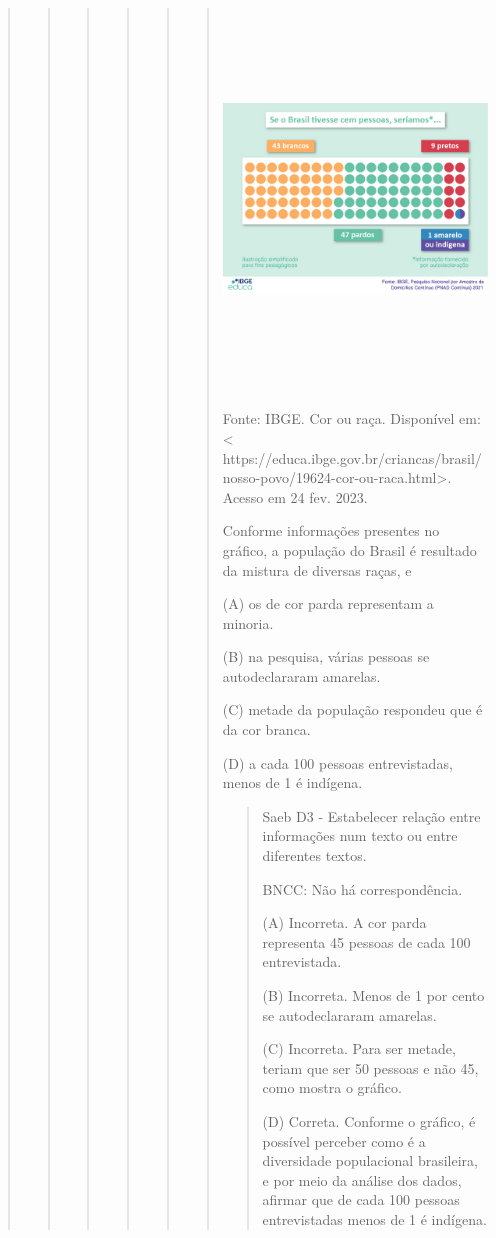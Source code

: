 \begin{quote}
\begin{quote}
\begin{quote}
\begin{quote}
\begin{quote}
\begin{quote}
\includegraphics[width=5.51042in,height=3.98702in]{media/image32.jpeg}

\protect\hypertarget{_Hlk40547643}{}{}

Fonte: IBGE. Cor ou raça. Disponível em: \textless{}
https://educa.ibge.gov.br/criancas/brasil/nosso-povo/19624-cor-ou-raca.html\textgreater{}.
Acesso em 24 fev. 2023.

Conforme informações presentes no gráfico, a população do Brasil é
resultado da mistura de diversas raças, e

(A) os de cor parda representam a minoria.

(B) na pesquisa, várias pessoas se autodeclararam amarelas.

(C) metade da população respondeu que é da cor branca.

(D) a cada 100 pessoas entrevistadas, menos de 1 é indígena.

\begin{quote}
Saeb D3 - Estabelecer relação entre informações num texto ou entre
diferentes textos.

BNCC: Não há correspondência.

(A) Incorreta. A cor parda representa 45 pessoas de cada 100
entrevistada.

(B) Incorreta. Menos de 1 por cento se autodeclararam amarelas.

(C) Incorreta. Para ser metade, teriam que ser 50 pessoas e não 45, como
mostra o gráfico.

(D) Correta. Conforme o gráfico, é possível perceber como é a
diversidade populacional brasileira, e por meio da análise dos dados,
afirmar que de cada 100 pessoas entrevistadas menos de 1 é indígena.
\end{quote}


\end{quote}
\end{quote}
\end{quote}
\end{quote}
\end{quote}
\end{quote}
